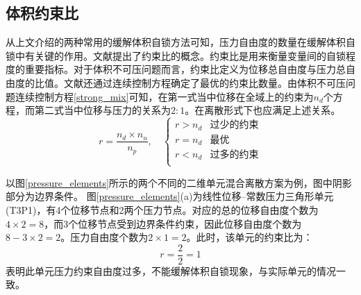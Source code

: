 \subsection{体积约束比}
从上文介绍的两种常用的缓解体积自锁方法可知，压力自由度的数量在缓解体积自锁中有关键的作用。文献{\cite{hughes2000}}提出了约束比的概念。约束比是用来衡量变量间的自锁程度的重要指标。对于体积不可压问题而言，约束比定义为位移总自由度与压力总自由度的比值。文献{\cite{hughes2000}}还通过连续控制方程确定了最优的约束比数量。由体积不可压问题连续控制方程\eqref{strong_mix}可知，在第一式当中位移在全域上的约束为$n_d$个方程，而第二式当中位移与压力的关系为$2:1$。在离散形式下也应满足上述关系。
\begin{equation}
    r = \frac{n_d\times n_u}{n_p}, \quad 
    \begin{cases}
        r > n_d & \text{过少的约束} \\
        r = n_d & \text{最优} \\
        r < n_d & \text{过多的约束} \\
    \end{cases}
\end{equation}

以图\ref{pressure_elements}所示的两个不同的二维单元混合离散方案为例，图中阴影部分为边界条件。
图\ref{pressure_elements}(a)为线性位移--常数压力三角形单元(T3P1)，有4个位移节点和2两个压力节点。对应的总的位移自由度个数为$4\times2=8$，而3个位移节点受到边界条件约束，因此位移自由度个数为$8-3\times2=2$。压力自由度个数为$2\times1=2$。此时，该单元的约束比为：
\begin{equation}
    r=\frac{2}{2}=1
\end{equation}
表明此单元压力约束自由度过多，不能缓解体积自锁现象，与实际单元的情况一致。

